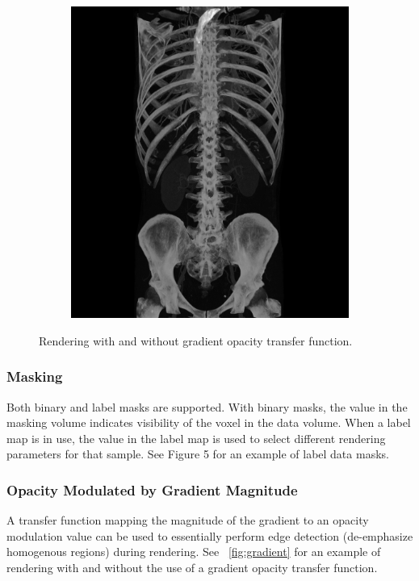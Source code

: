 \begin{figure}
\begin{subfigure}{.6\columnwidth}
\end{subfigure} 
\begin{subfigure}{.6\columnwidth}
    \includegraphics[width=\columnwidth]{TorsoBlendingMIP.png}
\end{subfigure}
\caption{Rendering with and without gradient opacity transfer function.}
\label{fig:blendingmodes}
\end{figure}

\subsubsection{Masking}
Both binary and label masks are supported. With binary masks, the value in the masking volume indicates visibility of the voxel in the data volume. When a label map is in use, the value in the label map is used to select different rendering parameters for that sample.  See Figure 5 for an example of label data masks.

\subsubsection{Opacity Modulated by Gradient Magnitude}
A transfer function mapping the magnitude of the gradient to an opacity modulation value can be used to essentially perform edge detection (de-emphasize homogenous regions) during rendering. See ~\ref{fig:gradient} for an example of rendering with and without the use of a gradient opacity transfer function.

